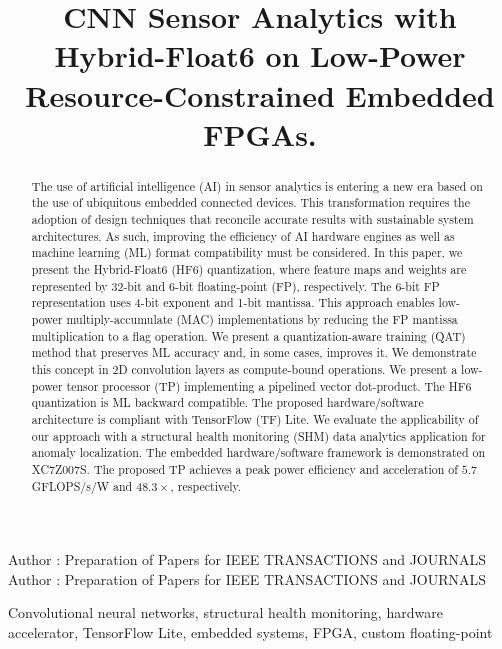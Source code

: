\title {CNN Sensor Analytics with Hybrid-Float6 on Low-Power Resource-Constrained Embedded FPGAs.}



\markboth
{Author \headeretal: Preparation of Papers for IEEE TRANSACTIONS and JOURNALS}
{Author \headeretal: Preparation of Papers for IEEE TRANSACTIONS and JOURNALS}


\begin{abstract}
The use of artificial intelligence (AI) in sensor analytics is entering a new era based on the use of ubiquitous embedded connected devices. This transformation requires the adoption of design techniques that reconcile accurate results with sustainable system architectures. As such, improving the efficiency of AI hardware engines as well as machine learning (ML) format compatibility must be considered. In this paper, we present the Hybrid-Float6 (HF6) quantization, where feature maps and weights are represented by 32-bit and 6-bit floating-point (FP), respectively. The 6-bit FP representation uses 4-bit exponent and 1-bit mantissa. This approach enables low-power multiply-accumulate (MAC) implementations by reducing the FP mantissa multiplication to a flag operation. We present a quantization-aware training (QAT) method that preserves ML accuracy and, in some cases, improves it. We demonstrate this concept in 2D convolution layers as compute-bound operations. We present a low-power tensor processor (TP) implementing a pipelined vector dot-product. The HF6 quantization is ML backward compatible. The proposed hardware/software architecture is compliant with TensorFlow (TF) Lite. We evaluate the applicability of our approach with a structural health monitoring (SHM) data analytics application for anomaly localization. The embedded hardware/software framework is demonstrated on XC7Z007S. The proposed TP achieves a peak power efficiency and acceleration of $5.7$ GFLOPS/s/W and $48.3\times$, respectively.
\end{abstract}

\begin{keywords}
Convolutional neural networks, structural health monitoring, hardware accelerator, TensorFlow Lite, embedded systems, FPGA, custom floating-point
\end{keywords}

\titlepgskip=-15pt

\maketitle